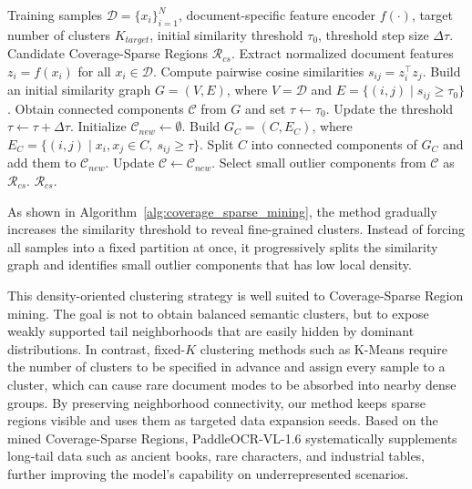 \documentclass[11pt, a4paper,logo,  copyright, nonumbering]{paddleocr}
\begin{document}
\begin{algorithm}[H]
\caption{Coverage-Sparse Region Mining}
\label{alg:coverage_sparse_mining}
\begin{algorithmic}[1]
\REQUIRE Training samples $\mathcal{D}=\{x_i\}_{i=1}^{N}$, document-specific feature encoder $f(\cdot)$, target number of clusters $K_{target}$, initial similarity threshold $\tau_0$, threshold step size $\Delta\tau$.
\ENSURE Candidate Coverage-Sparse Regions $\mathcal{R}_{cs}$.
\STATE Extract normalized document features $z_i = f(x_i)$ for all $x_i \in \mathcal{D}$.
\STATE Compute pairwise cosine similarities $s_{ij}=z_i^{\top}z_j$.
\STATE Build an initial similarity graph $G=(V,E)$, where $V=\mathcal{D}$ and $E=\{(i,j)\mid s_{ij} \geq \tau_0\}$.
\STATE Obtain connected components $\mathcal{C}$ from $G$ and set $\tau \leftarrow \tau_0$.
    \STATE Update the threshold $\tau \leftarrow \tau + \Delta\tau$.
    \STATE Initialize $\mathcal{C}_{new} \leftarrow \emptyset$.
        \STATE Build $G_C=(C,E_C)$, where $E_C=\{(i,j)\mid x_i,x_j\in C,\ s_{ij}\geq\tau\}$.
        \STATE Split $C$ into connected components of $G_C$ and add them to $\mathcal{C}_{new}$.
    \ENDFOR
    \STATE Update $\mathcal{C} \leftarrow \mathcal{C}_{new}$.
\ENDWHILE
\STATE Select small outlier components from $\mathcal{C}$ as $\mathcal{R}_{cs}$.
\RETURN $\mathcal{R}_{cs}$.
\end{algorithmic}
\end{algorithm}

As shown in Algorithm~\ref{alg:coverage_sparse_mining}, the method gradually increases the similarity threshold to reveal fine-grained clusters. Instead of forcing all samples into a fixed partition at once, it progressively splits the similarity graph and identifies small outlier components that has low local density.

This density-oriented clustering strategy is well suited to Coverage-Sparse Region mining. The goal is not to obtain balanced semantic clusters, but to expose weakly supported tail neighborhoods that are easily hidden by dominant distributions. In contrast, fixed-$K$ clustering methods such as K-Means require the number of clusters to be specified in advance and assign every sample to a cluster, which can cause rare document modes to be absorbed into nearby dense groups. By preserving neighborhood connectivity, our method keeps sparse regions visible and uses them as targeted data expansion seeds. Based on the mined Coverage-Sparse Regions, PaddleOCR-VL-1.6 systematically supplements long-tail data such as ancient books, rare characters, and industrial tables, further improving the model's capability on underrepresented scenarios.
\end{document}
